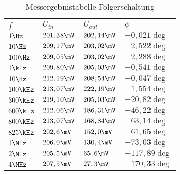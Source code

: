 \begin{table}[H]
\centering
\caption{Messergebnistabelle Folgerschaltung}
\label{tab:folger_erg_tab}
\begin{tabular}{|l|l|l|l|}
\hline
\rowcolor[HTML]{C0C0C0} 
$f$       & $U_{in}$    & $U_{out}$   & $\phi$        \\ \hline
$1\Hz$    & $201,38\mV$ & $202,14\mV$ & $-0,021\deg$  \\ \hline
$10\Hz$   & $209,17\mV$ & $203,02\mV$ & $-2,522\deg$  \\ \hline
$100\Hz$  & $209,05\mV$ & $203,02\mV$ & $-2,288\deg$  \\ \hline
$1\kHz$   & $209,80\mV$ & $205,03\mV$ & $-0,541\deg$  \\ \hline
$10\Hz$   & $212,19\mV$ & $208,54\mV$ & $-0,047\deg$  \\ \hline
$100\kHz$ & $213,07\mV$ & $222,19\mV$ & $-1,554\deg$  \\ \hline
$300\kHz$ & $219,10\mV$ & $205,03\mV$ & $-20,82\deg$  \\ \hline
$600\kHz$ & $212,06\mV$ & $186,31\mV$ & $-46,22\deg$  \\ \hline
$800\kHz$ & $213,07\mV$ & $168,84\mV$ & $-63,14\deg$  \\ \hline
$825\kHz$ & $202,6\mV$  & $152,0\mV$  & $-61,65\deg$  \\ \hline
$1\MHz$   & $206,0\mV$  & $130,4\mV$  & $-73,03\deg$  \\ \hline
$2\MHz$   & $205,5\mV$  & $65,6\mV$   & $-117,89\deg$ \\ \hline
$4\MHz$   & $207,5\mV$  & $27,3\mV$   & $-170,33\deg$ \\ \hline
\end{tabular}
\end{table}